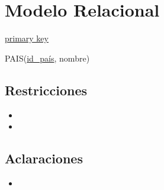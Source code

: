 \section{Modelo Relacional}

\begin{framed} \centering
  \underline{primary key} \hspace*{3cm}
\end{framed}

\vspace*{0.5cm}
\noindent
PAIS(\underline{id\_país}, nombre)

\subsection{Restricciones}
\begin{itemize}
  \item
  
  \item
\end{itemize}

\subsection{Aclaraciones}
\begin{itemize}
  \item

\end{itemize}
